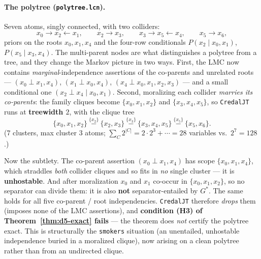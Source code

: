 \documentclass[11pt]{article}
\begin{document}
\paragraph{The polytree (\texttt{polytree.lcn}).} Seven atoms, singly connected, with two colliders:
\[
  x_0\to x_2\leftarrow x_1,\qquad x_2\to x_3,\qquad x_3\to x_5\leftarrow x_4,\qquad x_5\to x_6,
\]
priors on the roots $x_0,x_1,x_4$ and the four-row conditionals $P(x_2\mid x_0,x_1)$,
$P(x_5\mid x_3,x_4)$. The multi-parent nodes are what distinguishes a polytree from a tree, and they
change the Markov picture in two ways. First, the LMC now contains \emph{marginal}-independence
assertions of the co-parents and unrelated roots --- $(x_0\perp x_1,x_4)$, $(x_1\perp x_0,x_4)$,
$(x_4\perp x_0,x_1,x_2,x_3)$ --- and a small conditional one $(x_2\perp x_4\mid x_0,x_1)$. Second,
moralizing each collider \emph{marries its co-parents}: the family cliques become $\{x_0,x_1,x_2\}$
and $\{x_3,x_4,x_5\}$, so \texttt{CredalJT} runs at \textbf{treewidth $2$}, with the clique tree
\[
  \{x_0,x_1,x_2\}\ \overset{\{x_2\}}{-}\ \{x_2,x_3\}\ \overset{\{x_3\}}{-}\ \{x_3,x_4,x_5\}\
  \overset{\{x_5\}}{-}\ \{x_5,x_6\}.
\]
(7 clusters, max cluster $3$ atoms; $\sum_C 2^{|C|}=2\cdot 2^3+\cdots = 28$ variables vs.\ $2^7=128$.)

Now the subtlety. The co-parent assertion $(x_0\perp x_1,x_4)$ has scope $\{x_0,x_1,x_4\}$, which
straddles \emph{both} collider cliques and so fits in \emph{no} single cluster --- it is
\textbf{unhostable}. And after moralization $x_0$ and $x_1$ co-occur in $\{x_0,x_1,x_2\}$, so no
separator can divide them: it is also \textbf{not} separator-entailed by $G^\ast$. The same holds for
all five co-parent / root independencies. \texttt{CredalJT} therefore \emph{drops} them (imposes
none of the LMC assertions), and \textbf{condition (H3) of Theorem~\ref{thm:d5-exact} fails} --- the
theorem does \emph{not} certify the polytree exact. This is structurally the \texttt{smokers}
situation (an unentailed, unhostable independence buried in a moralized clique), now arising on a
clean polytree rather than from an undirected clique.
\end{document}
